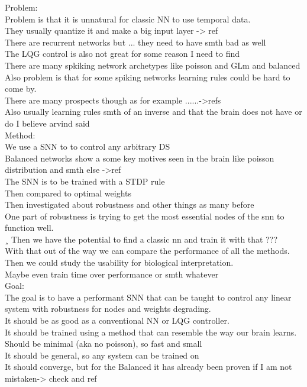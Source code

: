 Problem:\\
Problem is that it is unnatural for classic NN to use temporal data.\\
They usually quantize it and make a big input layer -> ref\\
There are recurrent networks but ... they need to have smth bad as well\\
The LQG control is also not great for some reason I need to find\\
There are many spkiking network archetypes like poisson and GLm and balanced\\
Also problem is that for some spiking networks learning rules could be hard to come by.\\
There are many prospects though as for example ......->refs\\
Also usually learning rules smth of an inverse and that the brain does not have or do I believe arvind said\\



Method:\\
We use a SNN to to control any arbitrary DS\\
Balanced networks show a some key motives seen in the brain like poisson distribution and smth else ->ref\\
The SNN is to be trained with a STDP rule\\
Then compared to optimal weights\\
Then investigated about robustness and other things as many before\\
One part of robustness is trying to get the most essential nodes of the snn to function well.\\¸
Then we have the potential to find a classic nn and train it with that ???\\
With that out of the way we can compare the performance of all the methods.\\
Then we could study the usability for biological interpretation.\\
Maybe even train time over performance or smth whatever\\

Goal:\\
The goal is to have a performant SNN that can be taught to control any linear system with robustness for nodes and weights degrading.\\
It should be as good as a conventional NN or LQG controller.\\
It should be trained using a method that can resemble the way our brain learns.\\
Should be minimal (aka no poisson), so fast and small \\
It should be general, so any system can be trained on\\
It should converge, but for the Balanced it has already been proven if I am not mistaken-> check and ref\\


